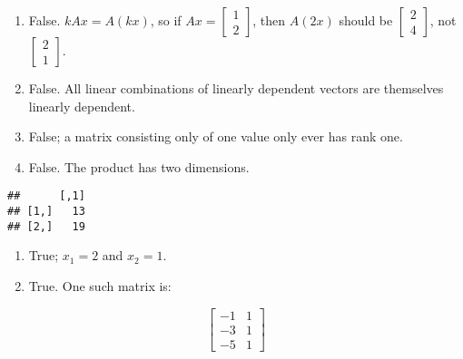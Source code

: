\documentclass[]{article}
\newenvironment{Shaded}{\begin{snugshade}}{\end{snugshade}}
\newcommand{\DataTypeTok}[1]{\textcolor[rgb]{0.13,0.29,0.53}{#1}}
\newcommand{\DecValTok}[1]{\textcolor[rgb]{0.00,0.00,0.81}{#1}}
\newcommand{\KeywordTok}[1]{\textcolor[rgb]{0.13,0.29,0.53}{\textbf{#1}}}
\newcommand{\NormalTok}[1]{#1}
\newcommand{\OperatorTok}[1]{\textcolor[rgb]{0.81,0.36,0.00}{\textbf{#1}}}
\newcommand{\StringTok}[1]{\textcolor[rgb]{0.31,0.60,0.02}{#1}}
\begin{document}
\begin{enumerate}
\def\labelenumi{\arabic{enumi}.}
\setcounter{enumi}{15}
\item
  False. \(kAx=A(kx)\), so if \(Ax=\begin{bmatrix}1\\2\end{bmatrix}\),
  then \(A(2x)\) should be \(\begin{bmatrix}2\\4\end{bmatrix}\), not
  \(\begin{bmatrix}2\\1\end{bmatrix}\).
\item
  False. All linear combinations of linearly dependent vectors are
  themselves linearly dependent.
\item
  False; a matrix consisting only of one value only ever has rank one.
\item
  False. The product has two dimensions.
\end{enumerate}

\begin{Shaded}
\end{Shaded}

\begin{verbatim}
##      [,1]
## [1,]   13
## [2,]   19
\end{verbatim}

\begin{enumerate}
\def\labelenumi{\arabic{enumi}.}
\setcounter{enumi}{19}
\item
  True; \(x_1=2\) and \(x_2=1\).
\item
  True. One such matrix is:
\end{enumerate}

\[\begin{bmatrix}-1&1\\
-3&1\\
-5&1\end{bmatrix}\]
\end{document}

